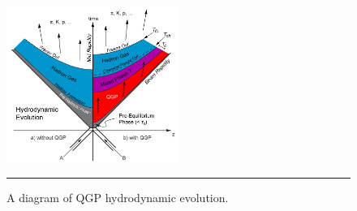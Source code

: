 \begin{figure}[b!]
  \centering

    \includegraphics[width=0.5\textwidth]{Figures/hydrodynamicevolution.JPG}
\rule{35em}{0.5pt}
  \caption[A diagram of QGP hydrodynamic evolution.]{A diagram of QGP hydrodynamic evolution.}
  \label{fig:hydroevolution}

\end{figure}

